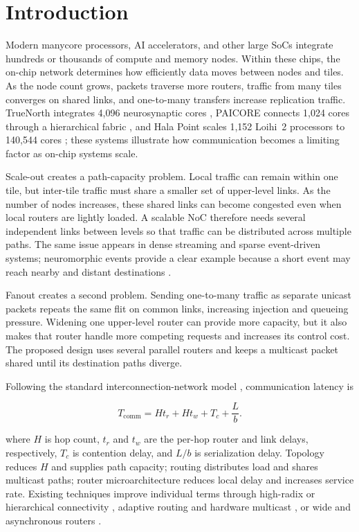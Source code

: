 \documentclass[conference]{IEEEtran}
\begin{document}
\section{Introduction}\label{sec:introduction}

Modern manycore processors, AI accelerators, and other large SoCs integrate
hundreds or thousands of compute and memory nodes. Within these chips, the
on-chip network determines how efficiently data moves between nodes and
tiles. As the node count grows, packets traverse more routers, traffic from
many tiles converges on shared links, and one-to-many
transfers increase replication traffic. TrueNorth integrates 4,096 neurosynaptic cores
\cite{merolla2014truenorth}, PAICORE connects 1,024 cores through a
hierarchical fabric \cite{zhong2025paicore}, and Hala Point scales 1,152
Loihi~2 processors to 140,544 cores \cite{intel2021loihi2,intel2024halapoint};
these systems illustrate how communication becomes a limiting factor as
on-chip systems scale.

Scale-out creates a path-capacity problem. Local traffic can remain within one
tile, but inter-tile traffic must share a smaller set of upper-level links.
As the number of nodes increases, these shared links
can become congested even when local routers are lightly loaded. A scalable
NoC therefore needs several independent links between levels so that traffic
can be distributed across multiple paths. The same issue appears in dense
streaming and sparse event-driven systems; neuromorphic events provide a clear
example because a short event may reach nearby and distant destinations
\cite{moradi2018dynaps,merolla2014tree,su2025hbs}.

Fanout creates a second problem. Sending one-to-many traffic as separate
unicast packets repeats the same flit on common links, increasing injection
and queueing pressure. Widening one upper-level router can provide more
capacity, but it also makes that router handle more competing requests and
increases its control cost. The proposed design uses several parallel routers
and keeps a multicast packet shared until its destination paths diverge.

Following the standard interconnection-network model
\cite{dally2004book,krishna2013smart}, communication latency is

\begin{equation}\label{eq:latency} T_{\mathrm{comm}} = Ht_r + Ht_w + T_c + \frac{L}{b}. \end{equation}

where \(H\) is hop count, \(t_r\) and \(t_w\) are the per-hop router and link
delays, respectively, \(T_c\) is contention delay, and \(L/b\) is serialization delay.
Topology reduces \(H\) and supplies path capacity; routing distributes
load and shares multicast paths; router microarchitecture reduces local
delay and increases service rate. Existing techniques improve individual
terms through high-radix or hierarchical connectivity
\cite{kim2007flattened,zhong2025paicore}, adaptive routing and hardware
multicast \cite{xiang2017carpool,jerger2008vctm}, or wide and asynchronous
routers \cite{fischer2025floonoc,liu2026monet,zhang2026reusable}.
\end{document}

